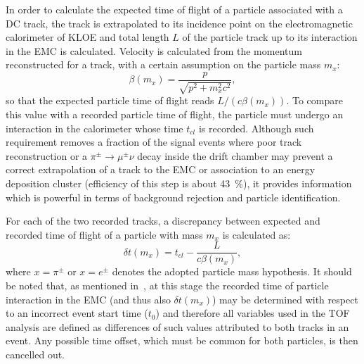 %
%
In order to calculate the expected time of flight of a particle associated with a DC track, the track is extrapolated to its incidence point on the electromagnetic calorimeter of KLOE and total length $L$ of the particle track up to its interaction in the EMC is calculated. Velocity is calculated from the momentum reconstructed for a track, with a certain assumption on the particle mass $m_x$:
\begin{equation}
  \label{eq:track_beta}
  \beta(m_x) = \frac{p}{\sqrt{p^{2}+m_x^{2}c^{2}}},
\end{equation}
so that the expected particle time of flight reads $L/(c\beta(m_{x}))$. To compare this value with a recorded particle time of flight, the particle must undergo an interaction in the calorimeter whose time $t_{cl}$ is recorded. Although such requirement removes a fraction of the signal events where poor track reconstruction or a $\pi^{\pm}\to\mu^{\pm}\nu$ decay inside the drift chamber may prevent a correct extrapolation of a track to the EMC or association to an energy deposition cluster (efficiency of this step is about \SI{43}{\percent}), it provides information which is powerful in terms of background rejection and particle identification.

For each of the two recorded tracks, a discrepancy between expected and recorded time of flight of a particle with mass $m_{x}$ is calculated as:
\begin{equation}
  \label{eq:dtof_t1}
  \delta t({m_x}) = t_{cl} - \frac{L}{c\beta(m_x)},
\end{equation}
where $x=\pi^{\pm}$ or $x=e^{\pm}$ denotes the adopted particle mass hypothesis. It should be noted that, as mentioned in~, at this stage the recorded time of particle interaction in the EMC (and thus also $\delta t(m_{x})$) may be determined with respect to an incorrect event start time ($t_{0}$) and therefore all variables used in the TOF analysis are defined as differences of such values attributed to both tracks in an event. Any possible time offset, which must be common for both particles, is then cancelled out. 

